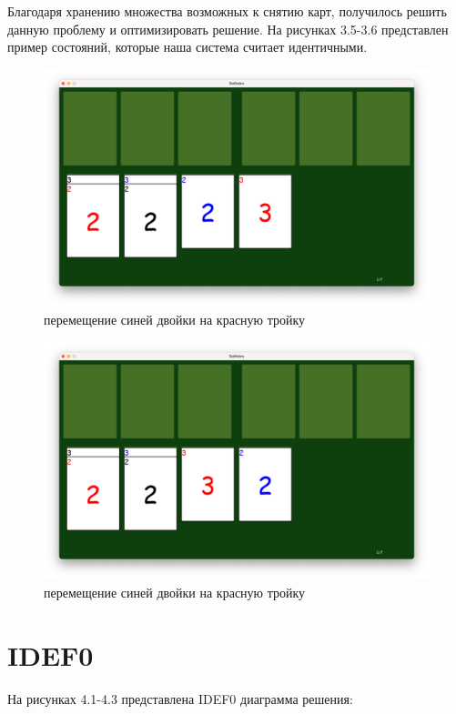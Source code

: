 \documentclass[12pt]{report}
\begin{document}
Благодаря хранению множества возможных к снятию карт, получилось решить данную проблему и оптимизировать решение.
На рисунках 3.5-3.6 представлен пример состояний, которые наша система считает идентичными.
\begin{figure}[H]
    	\begin{center}
    		\includegraphics[scale=0.25]{problem_10.png}
    		\caption{перемещение синей двойки на красную тройку}
    	\end{center}
\end{figure}
\begin{figure}[H]
    	\begin{center}
    		\includegraphics[scale=0.25]{problem_11.png}
    		\caption{перемещение синей двойки на красную тройку}
    	\end{center}
\end{figure}

\chapter{IDEF0}
На рисунках 4.1-4.3 представлена IDEF0 диаграмма решения:
\end{document}
